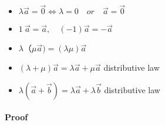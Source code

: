 \documentclass[UTF8]{ctexart}
\begin{document}
\begin{itemize}
\item $\lambda \vec a =\vec 0 \iff \lambda = 0 \quad or \quad  \vec  a = \vec 0 $
\item $1 \ \vec a=\vec a,\quad (-1)\vec a = - \vec  a$
\item $\lambda（\mu \vec a ) = (\lambda \mu )\vec  a$
\item $(\lambda + \mu )\vec  a = \lambda \vec a  + \mu \vec a$ distributive law 
\item $\lambda (\vec  a + \vec  b)= \lambda \vec a + \lambda \vec  b$ distributive law 
\end{itemize}

\paragraph{Proof}
\end{document}
